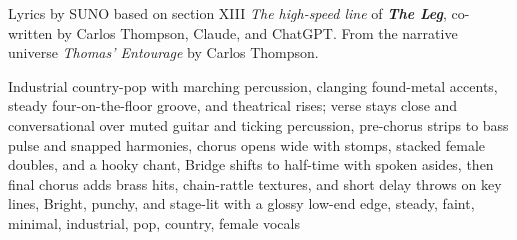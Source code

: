 
\begin{notes}
Lyrics by SUNO based on section XIII \emph{The high-speed line} of \emph{\bfseries The Leg}, %
co-written by Carlos Thompson, Claude, and ChatGPT. %
From the narrative universe \emph{Thomas’ Entourage} by Carlos Thompson.
\end{notes}
\begin{style}
Industrial country-pop with marching percussion, clanging found-metal accents, steady four-on-the-floor groove, and theatrical rises; verse stays close and conversational over muted guitar and ticking percussion, pre-chorus strips to bass pulse and snapped harmonies, chorus opens wide with stomps, stacked female doubles, and a hooky chant, Bridge shifts to half-time with spoken asides, then final chorus adds brass hits, chain-rattle textures, and short delay throws on key lines, Bright, punchy, and stage-lit with a glossy low-end edge, steady, faint, minimal, industrial, pop, country, female vocals
\end{style}
